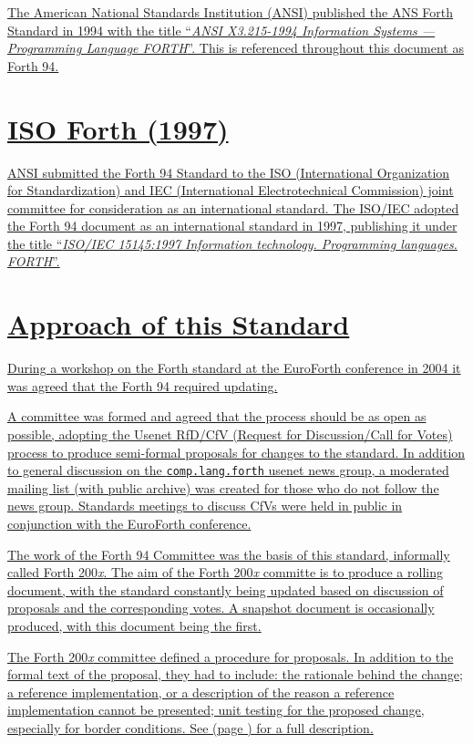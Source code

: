 \uline{%
The American National Standards Institution (ANSI) published the ANS
Forth Standard in 1994 with the title ``\emph{ANSI X3.215-1994
Information Systems --- Programming Language FORTH}''.  This is referenced
throughout this document as Forth 94.}

\section[ISO Forth (1997)]{\uline{ISO Forth (1997)}}
\label{diff:iso}

\uline{%
ANSI submitted the Forth 94 Standard to the
ISO (International Organization for Standardization) and
IEC (International Electrotechnical Commission) joint committee for
consideration as an international standard.
The ISO/IEC adopted the Forth 94 document as an international standard
in 1997, publishing it under the title ``\emph{ISO/IEC 15145:1997
Information technology.  Programming languages.  FORTH}''.
}


\section[Approach of this Standard]{\uline{Approach of this Standard}} %
\label{diff:approach}

\uline{%
During a workshop on the Forth standard at the EuroForth conference in
2004 it was agreed that the Forth 94 required updating.}

\uline{%
A committee was formed and agreed that the process should be as open
as possible, adopting the Usenet RfD/CfV (Request for Discussion/Call
for Votes) process to produce semi-formal proposals for changes to the
standard.  In addition to general discussion on the \texttt{comp.lang.forth}
usenet news group, a moderated mailing list (with public archive) was
created for those who do not follow the news group.
Standards meetings to discuss CfVs were held in public in
conjunction with the EuroForth conference.}

\uline{%
The work of the Forth 94 Committee was the basis of this standard,
informally called Forth 200\emph{x}.  The aim of the Forth 200\emph{x}
committe is to produce a rolling document, with the standard constantly
being updated based on discussion of proposals and the corresponding
votes.  A snapshot document is occasionally produced, with this document
being the first.}

\uline{%
The Forth 200\emph{x} committee defined a procedure for proposals.  In
addition to the formal text of the proposal, they had to include:
the rationale behind the change;
a reference implementation, or a description of the reason a reference
implementation cannot be presented;
unit testing for the proposed change, especially for border conditions.
See  (page \pageref{process}) for a full description.}


